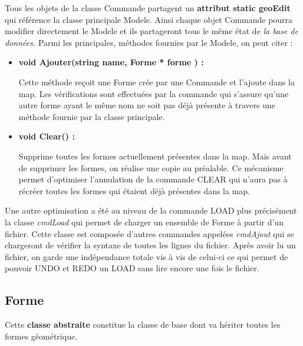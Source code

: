 \documentclass[12pt]{article}
\begin{document}
Tous les objets de la classe Commande partagent un \textbf{attribut static geoEdit} qui référence la classe principale Modele. Ainsi chaque objet Commande pourra modifier directement le Modele et ils partageront tous le même état de \textit{ la base de données.} Parmi les principales, méthodes fournies par le Modele, on peut citer :
\newline
\begin{itemize}
\item \textbf{void Ajouter(string name, Forme * forme ) :}

Cette méthode reçoit une Forme crée par une Commande et l’ajoute dans la map. Les vérifications sont effectuées par la commande qui s’assure qu’une autre forme ayant le même nom ne soit pas déjà présente à travers une méthode fournie par la classe principale.

\item \textbf{void Clear() :}

Supprime toutes les formes actuellement présentes dans la map. Mais avant de supprimer les formes, on réalise une copie au préalable. Ce mécanisme permet d’optimiser l’annulation de la commande CLEAR qui n’aura pas à récréer toutes les formes qui étaient déjà présentes dans la map.
\end{itemize}
Une autre optimisation a été au niveau de la commande LOAD plus précisément la classe \textit{ cmdLoad} qui permet de charger un ensemble de Forme à partir d'un fichier. Cette classe est composée d'autres commandes appelées \textit{cmdAjout} qui se chargeront de vérifier la syntaxe de toutes les lignes du fichier. Après avoir lu un fichier, on garde une indépendance totale vis à vis de celui-ci ce qui permet de pouvoir UNDO et REDO un LOAD sans lire encore une fois le fichier.

\subsection{Forme}
Cette \textbf{classe abstraite} constitue la classe de base dont va hériter toutes les formes géométrique.
\end{document}
